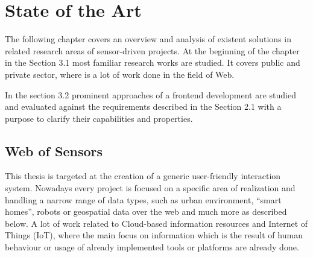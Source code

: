 \chapter{State of the Art}
The following chapter covers an overview and analysis of existent solutions in related research areas of sensor-driven projects. At the beginning of the chapter in the Section 3.1 most familiar research works are studied. It covers public and private sector, where is a lot of work done in the field of Web.

In the section 3.2 prominent approaches of a frontend development are studied and evaluated against the requirements described in the Section 2.1 with a purpose to clarify their capabilities and properties.  

\section{Web of Sensors}
 This thesis is targeted at the creation of a generic user-friendly interaction system. Nowadays every project is focused on a specific area of realization and handling a narrow range of data types, such as urban environment\cite{song2010real}, ``smart homes'', robots or geospatial data over the web\cite{6588063} and much more as described below. A lot of work related to Cloud-based information resources and Internet of Things (IoT), where the main focus on information which is the result of human behaviour or usage of already implemented tools or platforms are already done.  


